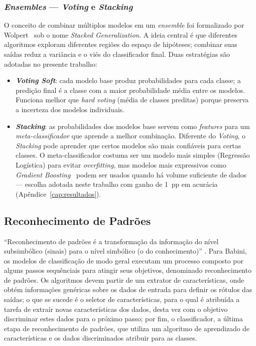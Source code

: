 \documentclass[tcc2]{uftex}
\begin{document}
\subsubsection{\emph{Ensembles} --- \emph{Voting} e \emph{Stacking}}
\label{subsec:fund_ensembles}

O conceito de combinar múltiplos modelos em um \emph{ensemble} foi formalizado por Wolpert~\cite{wolpert1992stacked} sob o nome \emph{Stacked Generalization}. A ideia central é que diferentes algoritmos exploram diferentes regiões do espaço de hipóteses; combinar suas saídas reduz a variância e o viés do classificador final. Duas estratégias são adotadas no presente trabalho:

\begin{itemize}
  \item \textbf{\emph{Voting Soft}}: cada modelo base produz probabilidades para cada classe; a predição final é a classe com a maior probabilidade média entre os modelos. Funciona melhor que \emph{hard voting} (média de classes preditas) porque preserva a incerteza dos modelos individuais.
  \item \textbf{\emph{Stacking}}: as probabilidades dos modelos base servem como \emph{features} para um \emph{meta-classificador} que aprende a melhor combinação. Diferente do \emph{Voting}, o \emph{Stacking} pode aprender que certos modelos são mais confiáveis para certas classes. O meta-classificador costuma ser um modelo mais simples (Regressão Logística) para evitar \emph{overfitting}, mas modelos mais expressivos como \emph{Gradient Boosting}~\cite{friedman2001greedy} podem ser usados quando há volume suficiente de dados --- escolha adotada neste trabalho com ganho de 1~pp em acurácia (Apêndice~\ref{cap:resultados}).
\end{itemize}

\subsection{Reconhecimento de Padrões}

``Reconhecimento de padrões é a transformação da informação do nível subsimbólico (sinais) para o nível simbólico (o do conhecimento)'' \cite[p.15]{Babini07}. Para Babini, os modelos de classificação de modo geral executam um processo composto por alguns passos sequênciais para atingir seus objetivos, denominado reconhecimento de padrões. Os algoritmos devem partir de um extrator de características, onde obtém informações genéricas sobre os dados de entrada para definir os rótulos das saídas; o que se sucede é o seletor de características, para o qual é atribuída a tarefa de extraír novas características dos dados, desta vez com o objetivo discriminar estes dados para o próximo passo; por fim, o classificador, a última etapa de reconhecimento de padrões, que utiliza um algoritmo de aprendizado de  características e os dados discriminados atribuir para as classes.
\end{document}
